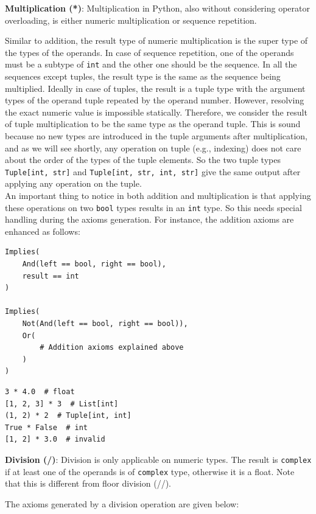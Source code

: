 \textbf{Multiplication (*)}:
Multiplication in Python, also without considering operator overloading, is either numeric multiplication or sequence repetition.

Similar to addition, the result type of numeric multiplication is the super type of the types of the operands. In case of sequence repetition, one of the operands must be a subtype of \lstinline|int| and the other one should be the sequence. In all the sequences except tuples, the result type is the same as the sequence being multiplied. Ideally in case of tuples, the result is a tuple type with the argument types of the operand tuple repeated by the operand number. However, resolving the exact numeric value is impossible statically. Therefore, we consider the result of tuple multiplication to be the same type as the operand tuple. This is sound because no new types are introduced in the tuple arguments after multiplication, and as we will see shortly, any operation on tuple (e.g., indexing) does not care about the order of the types of the tuple elements. So the two tuple types \lstinline|Tuple[int, str]| and \lstinline|Tuple[int, str, int, str]| give the same output after applying any operation on the tuple.\\

An important thing to notice in both addition and multiplication is that applying these operations on two \lstinline|bool| types results in an \lstinline|int| type. So this needs special handling during the axioms generation. For instance, the addition axioms are enhanced as follows:
\begin{lstlisting}
Implies(
	And(left == bool, right == bool),
	result == int
)

Implies(
	Not(And(left == bool, right == bool)),
	Or(
		# Addition axioms explained above
	)
)
\end{lstlisting}

\begin{lstlisting}
3 * 4.0  # float
[1, 2, 3] * 3  # List[int]
(1, 2) * 2  # Tuple[int, int]
True * False  # int
[1, 2] * 3.0  # invalid
\end{lstlisting}

\textbf{Division (/)}: Division is only applicable on numeric types. The result is \lstinline|complex| if at least one of the operands is of \lstinline|complex| type, otherwise it is a float. Note that this is different from floor division (//).

The axioms generated by a division operation are given below:

